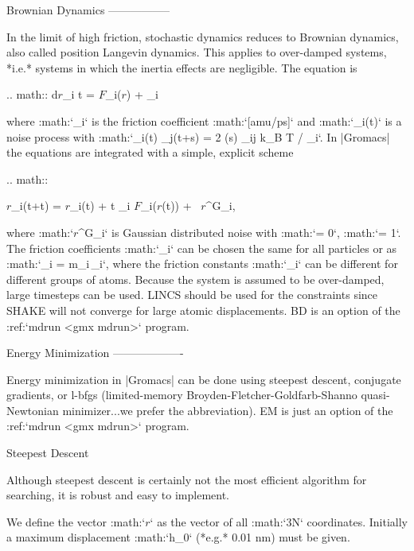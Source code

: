 Brownian Dynamics
-----------------

In the limit of high friction, stochastic dynamics reduces to Brownian
dynamics, also called position Langevin dynamics. This applies to
over-damped systems, *i.e.* systems in which the inertia effects are
negligible. The equation is

.. math:: {{\mbox{d}}{\mbox{\boldmath ${r}$}}_i t} =  {\mbox{\boldmath ${F}$}}_i({\mbox{\boldmath ${r}$}}) + {}_i

where :math:`\gamma_i` is the friction coefficient
:math:`[\mbox{amu/ps}]` and
:math:`{}_i\!\!(t)` is a noise
process with
:math:`_i\!\!(t) {}_j\!\!(t+s) \rangle = 2 \delta(s) \delta_{ij} k_B T / \gamma_i`. 
In |Gromacs| the equations
are integrated with a simple, explicit scheme

.. math::

   {\mbox{\boldmath ${r}$}}_i(t+\Delta t) = {\mbox{\boldmath ${r}$}}_i(t) +
           {\Delta t \over \gamma_i} {\mbox{\boldmath ${F}$}}_i({\mbox{\boldmath ${r}$}}(t)) 
           + \, {{\mbox{\boldmath ${r}$}}^G}_i,

where :math:`{{\mbox{\boldmath ${r}$}}^G}_i` is Gaussian distributed
noise with :math:`\mu = 0`, :math:`\sigma = 1`. The friction
coefficients :math:`\gamma_i` can be chosen the same for all particles
or as :math:`\gamma_i = m_i\,\gamma_i`, where the friction constants
:math:`\gamma_i` can be different for different groups of atoms. Because
the system is assumed to be over-damped, large timesteps can be used.
LINCS should be used for the constraints since SHAKE will not converge
for large atomic displacements. BD is an option of the
:ref:`mdrun <gmx mdrun>` program.

Energy Minimization
-------------------

Energy minimization in |Gromacs|
can be done using steepest descent, conjugate gradients, or l-bfgs
(limited-memory Broyden-Fletcher-Goldfarb-Shanno quasi-Newtonian
minimizer...we prefer the abbreviation). EM is just an option of the
:ref:`mdrun <gmx mdrun>` program.

Steepest Descent
~~~~~~~~~~~~~~~~

Although steepest descent is certainly not the most efficient algorithm
for searching, it is robust and easy to implement.

We define the vector :math:`{\mbox{\boldmath ${r}$}}` as the vector of
all :math:`3N` coordinates. Initially a maximum displacement :math:`h_0`
(*e.g.* 0.01 nm) must be given.

